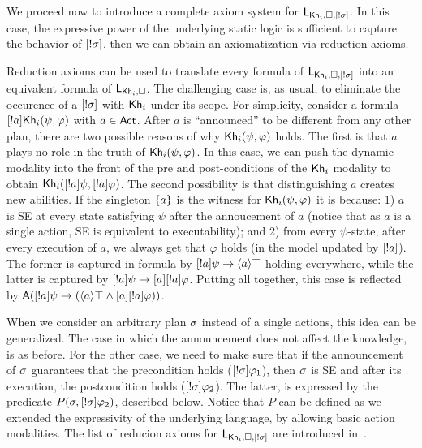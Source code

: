 We proceed now to introduce a complete axiom system for $\mathsf{L}_{{\sf Kh}_i,\square,[!\sigma]}$. In this case, the expressive power of the underlying static logic is sufficient to capture the behavior of $[!\sigma]$, then we can obtain an axiomatization via reduction axioms.

Reduction axioms can be used to translate every formula of $\mathsf{L}_{{\sf Kh}_i,\square,[!\sigma]}$ into an equivalent formula of $\mathsf{L}_{{\sf Kh}_i,\square}$. The challenging case is, as usual, to eliminate the occurence of a $[!\sigma]$ with ${\sf Kh}_i$ under its scope. For simplicity, consider a formula $[!a]{\sf Kh}_i(\psi,\varphi)$ with $a\in{\rm \sf Act}$. After $a$ is ``announced'' to be different from any other plan, there are two possible reasons of why ${\sf Kh}_i(\psi,\varphi)$ holds. The first is that $a$ plays no role in the truth of ${\sf Kh}_i(\psi,\varphi)$. In this case, we can push the dynamic modality into the front of the pre and post-conditions of the ${\sf Kh}_i$ modality to obtain ${\sf Kh}_i([!a]\psi,[!a]\varphi)$. The second possibility is that distinguishing $a$ creates new abilities. If the singleton $\{ a \}$ is the witness for ${\sf Kh}_i(\psi,\varphi)$ it is because: 1) $a$ is SE at every state satisfying $\psi$ after the annoucement of $a$ (notice that as $a$ is a single action, SE is equivalent to executability); and 2) from every $\psi$-state, after every execution of $a$, we always get that $\varphi$ holds (in the model updated by $[!a]$). The former is captured in formula by $[!a]\psi \rightarrow \langle a \rangle\top$ holding everywhere, while the latter is captured by $[!a]\psi \rightarrow [a][!a]\varphi$. Putting all together, this case is reflected by ${\sf A}([!a]\psi\rightarrow(\langle a \rangle\top\wedge[a][!a]\varphi))$.

When we consider an arbitrary plan $\sigma$ instead of a single actions, this idea can be generalized. The case in which the announcement does not affect the knowledge, is as before. For the other case, we need to make sure that if the announcement of $\sigma$ guarantees that the precondition holds ($[!\sigma]\varphi_1$), then $\sigma$ is SE and after its execution, the postcondition holds ($[!\sigma]\varphi_2$). 
The latter, is expressed by the predicate $P(\sigma,[!\sigma]\varphi_2)$, described below. Notice that $P$ can be defined as we extended the expressivity of the underlying language, by allowing basic action modalities. The list of reducion axioms for $\mathsf{L}_{{\sf Kh}_i,\square,[!\sigma]}$ are introduced in~.

